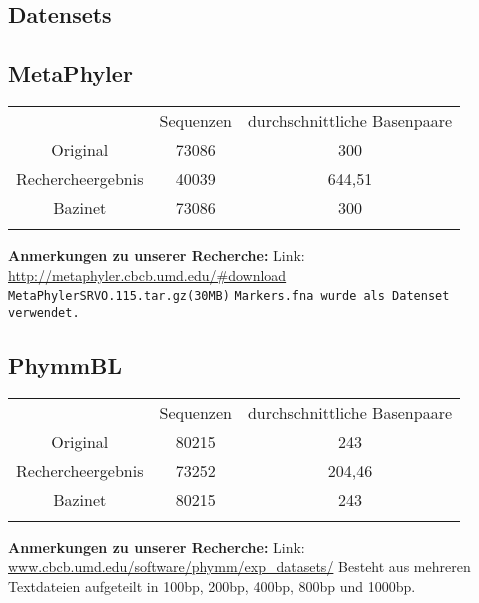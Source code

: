 \documentclass[a4paper, 11pt]{scrartcl}
\begin{document}
\begin{flushleft}


\section{Datensets}


\subsection{MetaPhyler}

\begin{tabular}{ccc}
& Sequenzen & durchschnittliche Basenpaare\\
Original&73086&300\\
Rechercheergebnis&40039&644,51\\
Bazinet&73086&300\\
&&\\
\end{tabular}
\linebreak
\color{red}
\textbf{Anmerkungen zu unserer Recherche:}\linebreak
Link: \url{http://metaphyler.cbcb.umd.edu/#download}
\linebreak
\texttt{MetaPhylerSRVO.115.tar.gz(30MB)}
\linebreak
\texttt{Markers.fna wurde als Datenset verwendet.}
\color{black}
\subsection{PhymmBL}

\begin{tabular}{ccc}
& Sequenzen & durchschnittliche Basenpaare \\
Original&80215&243\\
Rechercheergebnis&73252&204,46\\
Bazinet&80215&243\\
&&\\
\end{tabular}
\linebreak
\color{red}
\textbf{Anmerkungen zu unserer Recherche:}\linebreak
Link: \url{www.cbcb.umd.edu/software/phymm/exp_datasets/}
\linebreak
Besteht aus mehreren Textdateien aufgeteilt in 100bp, 200bp, 400bp, 800bp und 1000bp.
\color{black}


\end{flushleft}
\end{document}
